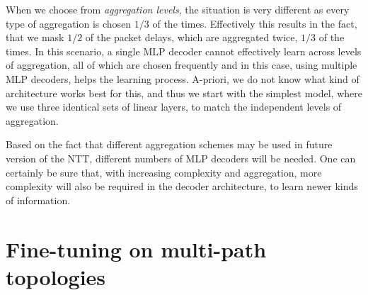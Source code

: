 When we choose from \emph{aggregation levels}, the situation is very different as every type of aggregation is chosen $1/3$ of the times. Effectively this results in the fact, that we mask $1/2$ of the packet delays, which are aggregated twice, $1/3$ of the times. In this scenario, a single MLP decoder cannot effectively learn across levels of aggregation, all of which are chosen frequently and in this case, using multiple MLP decoders, helps the learning process. A-priori, we do not know what kind of architecture works best for this, and thus we start with the simplest model, where we use three identical sets of linear layers, to match the independent levels of aggregation.

Based on the fact that different aggregation schemes may be used in future version of the NTT, different numbers of MLP decoders will be needed. One can certainly be sure that, with increasing complexity and aggregation, more complexity will also be required in the decoder architecture, to learn newer kinds of information.

\chapter{Fine-tuning on multi-path topologies}
\label{app:c}

